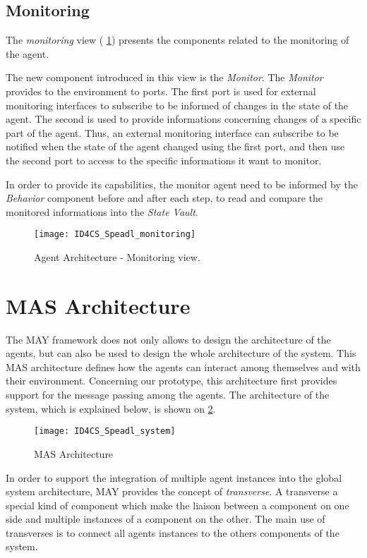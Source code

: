 \subsection{Monitoring}

The \emph{monitoring} view (\figurename{} \ref{Arch-monitor}) presents the components related to the monitoring of the agent. 

The new component introduced in this view is the \emph{Monitor}. The \emph{Monitor} provides to the environment to ports. The first port is used for external monitoring interfaces to subscribe to be informed of changes in the state of the agent. The second is used to provide informations concerning changes of a specific part of the agent. Thus, an external monitoring interface can subscribe to be notified when the state of the agent changed using the first port, and then use the second port to access to the specific informations it want to monitor.

In order to provide its capabilities, the monitor agent need to be informed by the \emph{Behavior} component before and after each step, to read and compare the monitored informations into the \emph{State Vault}.

\begin{figure}
\centering
\texttt{[image: ID4CS\_Speadl\_monitoring]}
\caption{Agent Architecture - Monitoring view.}
\label{Arch-monitor}
\end{figure}

\section{MAS Architecture}

The MAY framework does not only allows to design the architecture of the agents, but can also be used to design the whole architecture of the system. This MAS architecture defines how the agents can interact among themselves and with their environment. Concerning our prototype, this architecture first provides support for the message passing among the agents. The architecture of the system, which is explained below, is shown on \figurename{} \ref{Arch-MAS}.

\begin{figure}
\texttt{[image: ID4CS\_Speadl\_system]}
\caption{MAS Architecture}\label{Arch-MAS}
\end{figure}

In order to support the integration of multiple agent instances into the global system architecture, MAY provides the concept of \emph{transverse}. A transverse a special kind of component which make the liaison between a component on one side and multiple instances of a component on the other. The main use of transverses is to connect all agents instances to the others components of the system.

